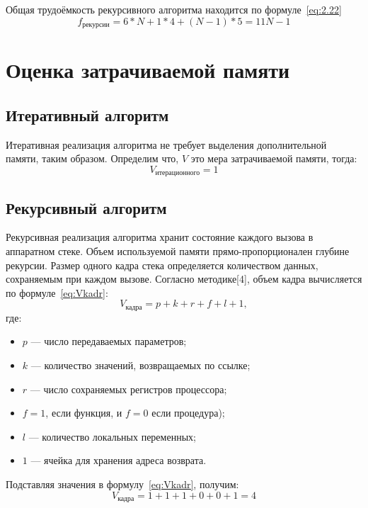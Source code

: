 Общая трудоёмкость рекурсивного алгоритма находится по формуле \ref{eq:2.22}
\begin{equation}
	f_{\text{рекурсии}} = 6 * N + 1 * 4 + (N - 1) * 5 = 11N - 1
	\label{eq:2.22}
\end{equation}


\section{Оценка затрачиваемой памяти}
\subsection{Итеративный алгоритм}
Итеративная реализация алгоритма не требует выделения дополнительной памяти, таким образом. Определим что, $V$ это мера затрачиваемой памяти, тогда:
\begin{equation}
	V_\text{{итерационного}} = 1
\end{equation}

\subsection{Рекурсивный алгоритм}
Рекурсивная реализация алгоритма хранит состояние каждого вызова в аппаратном стеке. Объем используемой памяти прямо-пропорционален глубине рекурсии. Размер одного кадра стека определяется количеством данных, сохраняемым при каждом вызове. Согласно методике[4], объем кадра вычисляется по формуле \ref{eq:Vkadr}: 
 \begin{equation}
 	V_{\text{кадра}} = p + k + r + f + l + 1,
	\label{eq:Vkadr}
 \end{equation}
 где:

\begin{itemize}
\item $p$ — число передаваемых параметров;
\item $k$ — количество значений, возвращаемых по ссылке;
\item $r$ — число сохраняемых регистров процессора;
\item $f = 1$, если функция, и $f = 0$ если процедура);
\item $l$ — количество локальных переменных;
\item $1$ — ячейка для хранения адреса возврата.
\end{itemize}
 
 Подставляя значения в формулу \eqref{eq:Vkadr}, получим:
 \begin{equation}
 	V_{\text{кадра}} = 1 + 1 + 1 + 0 + 0 + 1 = 4
 \end{equation}
 

